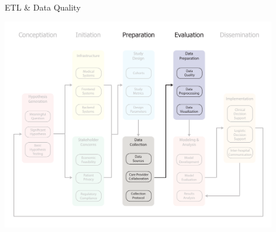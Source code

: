 \documentclass[10pt, xcolor=table]{beamer}
\begin{document}
\begin{frame}{ETL \& Data Quality}
	\begin{center}
		\includegraphics[width=0.9\textwidth]{images/informatics_pipeline_etl_data_quality.pdf}	
	\end{center}
\end{frame}
\end{document}
